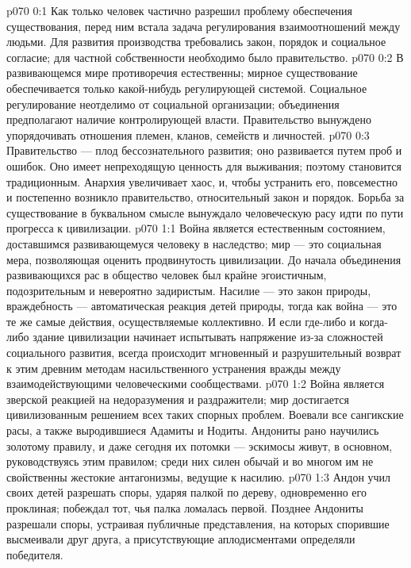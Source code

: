 \vs p070 0:1 Как только человек частично разрешил проблему обеспечения существования, перед ним встала задача регулирования взаимоотношений между людьми. Для развития производства требовались закон, порядок и социальное согласие; для частной собственности необходимо было правительство.
\vs p070 0:2 В развивающемся мире противоречия естественны; мирное существование обеспечивается только какой\hyp{}нибудь регулирующей системой. Социальное регулирование неотделимо от социальной организации; объединения предполагают наличие контролирующей власти. Правительство вынуждено упорядочивать отношения племен, кланов, семейств и личностей.
\vs p070 0:3 Правительство --- плод бессознательного развития; оно развивается путем проб и ошибок. Оно имеет непреходящую ценность для выживания; поэтому становится традиционным. Анархия увеличивает хаос, и, чтобы устранить его, повсеместно и постепенно возникло правительство, относительный закон и порядок. Борьба за существование в буквальном смысле вынуждало человеческую расу идти по пути прогресса к цивилизации.
\vs p070 1:1 Война является естественным состоянием, доставшимся развивающемуся человеку в наследство; мир --- это социальная мера, позволяющая оценить продвинутость цивилизации. До начала объединения развивающихся рас в общество человек был крайне эгоистичным, подозрительным и невероятно задиристым. Насилие --- это закон природы, враждебность --- автоматическая реакция детей природы, тогда как война --- это те же самые действия, осуществляемые коллективно. И если где\hyp{}либо и когда\hyp{}либо здание цивилизации начинает испытывать напряжение из\hyp{}за сложностей социального развития, всегда происходит мгновенный и разрушительный возврат к этим древним методам насильственного устранения вражды между взаимодействующими человеческими сообществами.
\vs p070 1:2 Война является зверской реакцией на недоразумения и раздражители; мир достигается цивилизованным решением всех таких спорных проблем. Воевали все сангикские расы, а также выродившиеся Адамиты и Нодиты. Андониты рано научились золотому правилу, и даже сегодня их потомки --- эскимосы живут, в основном, руководствуясь этим правилом; среди них силен обычай и во многом им не свойственны жестокие антагонизмы, ведущие к насилию.
\vs p070 1:3 Андон учил своих детей разрешать споры, ударяя палкой по дереву, одновременно его проклиная; побеждал тот, чья палка ломалась первой. Позднее Андониты разрешали споры, устраивая публичные представления, на которых спорившие высмеивали друг друга, а присутствующие аплодисментами определяли победителя.
